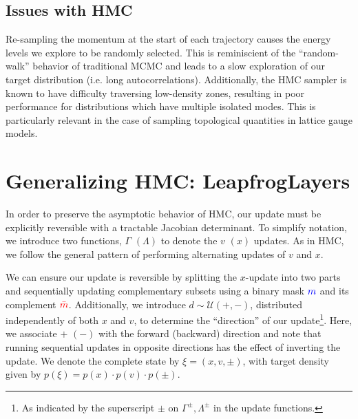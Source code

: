 \documentclass[a4paper,11pt]{article}
\newcommand{\mask}{\textcolor{blue}{{m}}}
\newcommand{\maskbar}{\textcolor{red}{\bar{m}}}
\begin{document}
\subsection{\label{subsec:hmc_issues}Issues with HMC}
%
Re-sampling the momentum at the start of each trajectory causes the energy
levels we explore to be randomly selected.
%
This is reminiscient of the ``random-walk'' behavior of traditional MCMC and
leads to a slow exploration of our target distribution (i.e. long
autocorrelations).
%
Additionally, the HMC sampler is known to have difficulty traversing
low-density zones, resulting in poor performance for distributions which have
multiple isolated modes.
%
This is particularly relevant in the case of sampling topological quantities in
lattice gauge models.
%
%
%
\section{\label{sec:l2hmc}Generalizing HMC: LeapfrogLayers}
%
In order to preserve the asymptotic behavior of HMC, our update must be
explicitly reversible with a tractable Jacobian determinant.
%
To simplify notation, we introduce two functions, \(\Gamma\) \((\Lambda)\) to
denote the \(v\) \((x)\) updates.
%
As in HMC, we follow the general pattern of performing alternating updates of
\(v\) and \(x\).
%

We can ensure our update is reversible by splitting the \(x\)-update into two
parts and sequentially updating complementary subsets using a binary mask
\(\mask\) and its complement \(\maskbar\).
%
Additionally, we introduce \(d \sim \mathcal{U} (+, -)\), distributed
independently of both \(x\) and \(v\), to determine the ``direction'' of our
update\footnote{%
  As indicated by the superscript \(\pm\) on \(\Gamma^{\pm}, \Lambda^{\pm}\) in
  the update functions.
}.
%
Here, we associate \(+\) \((-)\) with the forward (backward) direction and note
that running sequential updates in opposite directions has the effect of
inverting the update.
%
We denote the complete state by \(\xi = (x, v, \pm)\), with target density
given by \(p(\xi) = p(x)\cdot p(v)\cdot p(\pm)\).
%
\end{document}
